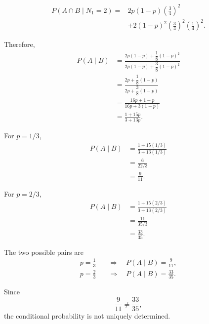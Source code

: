 \documentclass[11pt,a4paper]{article}
\begin{document}
\begin{enumerate}
\[
\begin{aligned}
P(A\cap B\mid N_1=2)
={}&2p(1-p)\left(\frac34\right)^2\\
&+2(1-p)^2
\left(\frac34\right)^2
\left(\frac14\right)^2.
\end{aligned}
\]

Therefore,
\[
\begin{aligned}
P(A\mid B)
&=\frac{
2p(1-p)+\dfrac18(1-p)^2
}{
2p(1-p)+\dfrac38(1-p)^2
}\\[6pt]
&=\frac{
2p+\dfrac18(1-p)
}{
2p+\dfrac38(1-p)
}\\[6pt]
&=\frac{16p+1-p}{16p+3(1-p)}\\[6pt]
&=\frac{1+15p}{3+13p}.
\end{aligned}
\]

For $p=1/3$,
\[
\begin{aligned}
P(A\mid B)
&=\frac{1+15(1/3)}{3+13(1/3)}\\
&=\frac6{22/3}\\
&=\frac9{11}.
\end{aligned}
\]

For $p=2/3$,
\[
\begin{aligned}
P(A\mid B)
&=\frac{1+15(2/3)}{3+13(2/3)}\\
&=\frac{11}{35/3}\\
&=\frac{33}{35}.
\end{aligned}
\]

The two possible pairs are
\[
\begin{aligned}
p=\frac13
&\quad\Longrightarrow\quad P(A\mid B)=\frac9{11},\\[4pt]
p=\frac23
&\quad\Longrightarrow\quad P(A\mid B)=\frac{33}{35}.
\end{aligned}
\]

Since
\[
\frac9{11}\ne\frac{33}{35},
\]
the conditional probability is not uniquely determined.

\end{enumerate}
\end{document}
